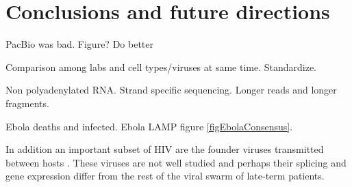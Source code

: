 \documentclass[../sherrill-Mix_thesis.tex]{subfiles}
\begin{document}
\chapter{Conclusions and future directions}
\graphicspath{{im/}{conclusion/im/}}


PacBio was bad. Figure? Do better

Comparison among labs and cell types/viruses at same time. Standardize.

Non polyadenylated RNA. Strand specific sequencing. Longer reads and longer fragments.

Ebola deaths and infected.  Ebola LAMP figure \ref{figEbolaConsensus}.

In addition an important subset of HIV are the founder viruses transmitted between hosts \citep{Keele2008,Salazar-Gonzalez2009}. These viruses are not well studied and perhaps their splicing and gene expression differ from the rest of the viral swarm of late-term patients.
\end{document}
